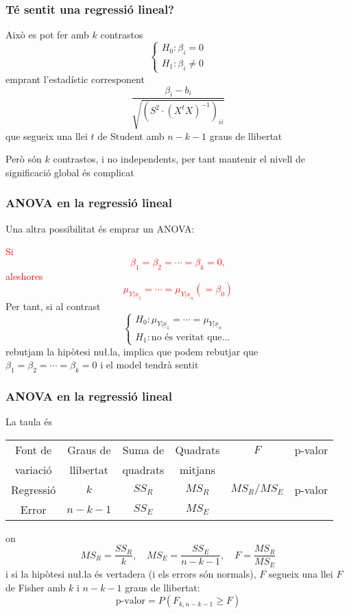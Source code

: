 \documentclass[12pt,t]{beamer}
\newcommand{\red}[1]{\textcolor{red}{#1}}
\renewcommand{\geq}{\geqslant}
\theoremstyle{plain}
\theoremstyle{definition}
\begin{document}
\begin{frame}
\frametitle{Té sentit una regressió lineal?}

Això es pot fer amb $k$ contrastos
$$
\left\{\begin{array}{l} H_0: \beta_i=0 \\
H_1: \beta_i\neq 0 \end{array}
\right.
$$
emprant l'estadístic corresponent
$$
\frac{\beta_i-b_i}{\sqrt{(S^2\cdot (X^t X)^{-1})_{ii}}}
$$
que segueix una llei $t$ de Student amb $n-k-1$ graus de
llibertat\medskip

Però són $k$ contrastos, i no independents, per tant mantenir el nivell de significació global és complicat


\end{frame}




\begin{frame}
\frametitle{ANOVA en la  regressió lineal}

Una altra possibilitat és emprar un ANOVA:
\medskip

\red{Si $$\beta_1=\beta_2=\cdots=\beta_k=0,$$ aleshores $$\mu_{Y|\underline{x}_1}=\cdots=\mu_{Y|\underline{x}_n}(=\beta_0)$$}
Per tant, si al contrast
$$
\left\{\begin{array}{l}
H_0:\mu_{Y|\underline{x}_1}=\cdots=\mu_{Y|\underline{x}_n}\\
H_1:\mbox{no és veritat que\ldots}
\end{array}
\right.
$$
rebutjam la hipòtesi nu\l.la, implica que podem rebutjar que $\beta_1=\beta_2=\cdots=\beta_k=0$
i el model tendrà sentit
\end{frame}


\begin{frame}
\frametitle{ANOVA en la  regressió lineal}
La taula és
\begin{center}
\footnotesize \hspace*{-2ex}\begin{tabular}{|c|c|c|c|c|c|}\hline
Font de & Graus de & Suma de & Quadrats & $F$ & p-valor\\
variació & llibertat &  quadrats & mitjans      &  & \\\hline
Regressió & $k$ & $SS_R$  & $MS_R$ & $MS_R/MS_E$ &  p-valor\\
Error & $n\!-\!k\!-\!1$ & $SS_E$  & $MS_E$ & &\\
\hline 
\end{tabular}
\end{center}
on
$$
MS_R=\frac{SS_R}{k},\quad MS_E=\frac{SS_E}{n-k-1},\quad F=\frac{MS_R}{MS_E}
$$
i si la hipòtesi nu\l.la és vertadera (i els errors són normals), $F$ segueix una llei $F$ de Fisher amb $k$ i $n-k-1$ graus de llibertat:
$$
\mbox{p-valor}=P(F_{k,n-k-1}\geq F)
$$
\end{frame}
\end{document}
